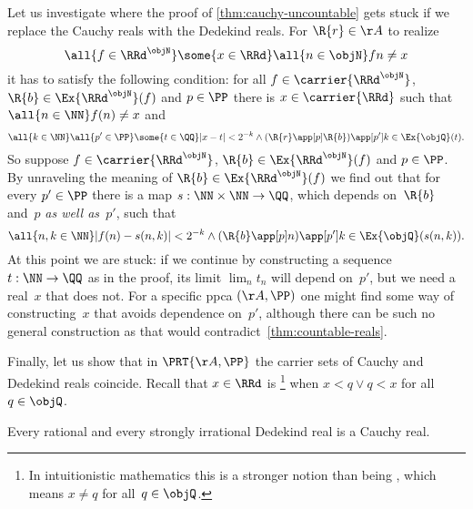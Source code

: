 Let us investigate where the proof of \cref{thm:cauchy-uncountable} gets stuck if we replace the Cauchy reals with the Dedekind reals.
For $\R{r} \in \AA$ to realize
% 
\begin{equation*}
  \all{f \in \RRd^\objN}
  \some{x \in \RRd}
  \all{n \in \objN}
  f n \neq x
\end{equation*}
%
it has to satisfy the following condition:
for all $f \in \carrier{\RRd^\objN}$, $\R{b} \in \Ex{\RRd^\objN}(f)$ and $p \in \PP$
there is $x \in \carrier{\RRd}$ such that $\all{n \in \NN} f(n) \neq x$ and
% 
\begin{equation*}
  \all{k \in \NN}
  \all{p' \in \PP}
  \some{t \in \QQ}
  |x - t| < 2^{-k}
  \land
  (\R{r} \app[p] \R{b}) \app[p'] k \in \Ex{\objQ}(t).
\end{equation*}
%
So suppose $f \in \carrier{\RRd^\objN}$, $\R{b} \in \Ex{\RRd^\objN}(f)$ and $p \in \PP$.
By unraveling the meaning of $\R{b} \in \Ex{\RRd^\objN}(f)$ we find out that
for every $p' \in \PP$ there is a map $s : \NN \times \NN \to \QQ$, which depends on~$\R{b}$ and~$p$ \emph{as well as~$p'$}, such that
%
\begin{equation*}
  \all{n, k \in \NN}
  |f(n) - s(n, k)| < 2^{-k}
  \land
  (\R{b} \app[p] n) \app[p'] k \in \Ex{\objQ}(s(n, k)).
\end{equation*}
%
At this point we are stuck: if we continue by constructing a sequence $t : \NN \to \QQ$ as in the proof, its limit $\lim_n t_n$ will depend on~$p'$, but we need a real~$x$ that does not.
For a specific ppca $(\AA, \PP)$ one might find some way of constructing~$x$ that avoids dependence on~$p'$,
although there can be such no general construction as that would contradict~\cref{thm:countable-reals}.

Finally, let us show that in $\PRT{\AA, \PP}$ the carrier sets of Cauchy and Dedekind reals coincide.
%
Recall that $x \in \RRd$ is \footnote{In intuitionistic mathematics this is a stronger notion than being , which means $x \neq q$ for all~$q \in \objQ$.} when $x < q \lor q < x$ for all $q \in \objQ$.

\begin{lemmaC}
  \label{lem:rat-irrat-cauchy}
  Every rational and every strongly irrational Dedekind real is a Cauchy real.
\end{lemmaC}

